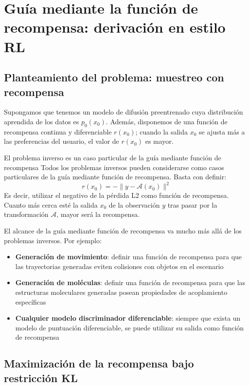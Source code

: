 \section{Guía mediante la función de recompensa: derivación en estilo RL}

\subsection{Planteamiento del problema: muestreo con recompensa}

Supongamos que tenemos un modelo de difusión preentrenado cuya distribución aprendida de los datos es $p_0(x_0)$. Además, disponemos de una función de recompensa continua y diferenciable $r(x_0)$; cuando la salida $x_0$ se ajusta más a las preferencias del usuario, el valor de $r(x_0)$ es mayor.

\begin{importantbox}{El problema inverso es un caso particular de la guía mediante función de recompensa}
Todos los problemas inversos pueden considerarse como casos particulares de la guía mediante función de recompensa. Basta con definir:
$$r(x_0) = -\| y - \mathcal{A}(x_0) \|^2$$
Es decir, utilizar el negativo de la pérdida L2 como función de recompensa. Cuanto más cerca esté la salida $x_0$ de la observación $y$ tras pasar por la transformación $\mathcal{A}$, mayor será la recompensa.
\end{importantbox}

El alcance de la guía mediante función de recompensa va mucho más allá de los problemas inversos. Por ejemplo:

\begin{itemize}
    \item \textbf{Generación de movimiento}: definir una función de recompensa para que las trayectorias generadas eviten colisiones con objetos en el escenario
    \item \textbf{Generación de moléculas}: definir una función de recompensa para que las estructuras moleculares generadas posean propiedades de acoplamiento específicas
    \item \textbf{Cualquier modelo discriminador diferenciable}: siempre que exista un modelo de puntuación diferenciable, se puede utilizar su salida como función de recompensa
\end{itemize}

\subsection{Maximización de la recompensa bajo restricción KL}


